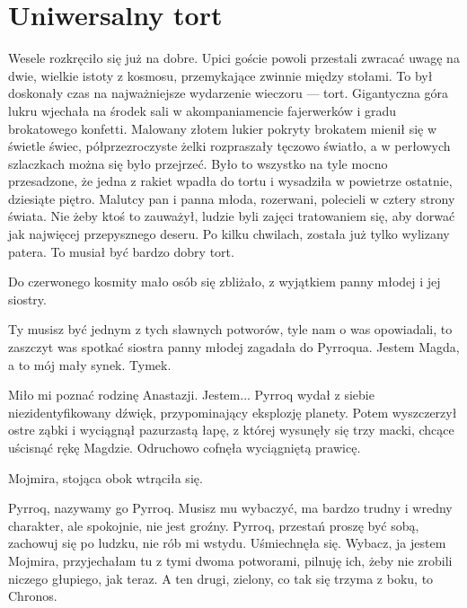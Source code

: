 \chapter{Uniwersalny tort}


Wesele rozkręciło się już na dobre. 
Upici goście powoli przestali zwracać uwagę na dwie, wielkie istoty z kosmosu, przemykające zwinnie między stołami.
To był doskonały czas na najważniejsze wydarzenie wieczoru --- tort.
Gigantyczna góra lukru wjechała na środek sali w akompaniamencie fajerwerków i gradu brokatowego konfetti. 
Malowany złotem lukier pokryty brokatem mienił się w świetle świec, półprzezroczyste żelki rozpraszały tęczowo światło, a w perłowych szlaczkach można się było przejrzeć.
Było to wszystko na tyle mocno przesadzone, że jedna z rakiet wpadła do tortu i wysadziła w powietrze ostatnie, dziesiąte piętro.
Malutcy pan i panna młoda, rozerwani, polecieli w cztery strony świata.
Nie żeby ktoś to zauważył, ludzie byli zajęci tratowaniem się, aby dorwać jak najwięcej przepysznego deseru. 
Po kilku chwilach, została już tylko wylizany patera. To musiał być bardzo dobry tort.

Do czerwonego kosmity mało osób się zbliżało, z wyjątkiem panny młodej i jej siostry.

\ds{} Ty musisz być jednym z tych sławnych potworów, tyle nam o was opowiadali, to zaszczyt was spotkać \dm{} siostra panny młodej zagadała do Pyrroqua. \dm{}
Jestem Magda, a to mój mały synek. Tymek. \de{}

\ds{} Miło mi poznać rodzinę Anastazji. Jestem... \dm{} Pyrroq wydał z siebie niezidentyfikowany dźwięk, przypominający eksplozję planety.
Potem wyszczerzył ostre ząbki i wyciągnął pazurzastą łapę, z której wysunęły się trzy macki, chcące uścisnąć rękę Magdzie. Odruchowo cofnęła wyciągniętą prawicę. \de{}

Mojmira, stojąca obok wtrąciła się.

\ds{} Pyrroq, nazywamy go Pyrroq. Musisz mu wybaczyć, ma bardzo trudny i wredny charakter, ale spokojnie, nie jest groźny. 
Pyrroq, przestań proszę być sobą, zachowuj się po ludzku, nie rób mi wstydu.
\dm{} Uśmiechnęła się. \dm{}
Wybacz, ja jestem Mojmira, przyjechałam tu z tymi dwoma potworami, pilnuję ich, żeby nie zrobili niczego głupiego, jak teraz. 
A ten drugi, zielony, co tak się trzyma z boku, to Chronos. \de{}


